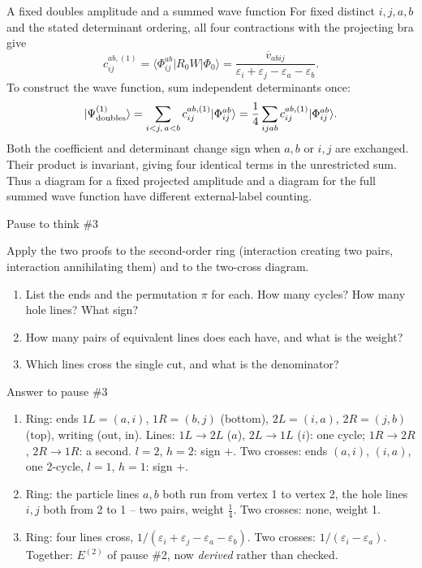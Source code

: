 \documentclass[aspectratio=169,10pt]{beamer}
\newcounter{thinkctr}
\newcommand{\thinkq}[2]{%
  \stepcounter{thinkctr}%
  \vfill
  \begin{tcolorbox}[enhanced,colback=palewarm,colframe=warm,boxrule=1.2pt,arc=4pt,
    grow to left by=6mm,grow to right by=6mm,
    left=16pt,right=16pt,top=16pt,bottom=18pt,
    fonttitle=\bfseries\Large,fontupper=\Large,
    title={Pause to think \#\thethinkctr\hfill\mdseries\normalsize(about #1 min -- discuss with your neighbour)}]
  #2
  \end{tcolorbox}
  \vfill}
\newcommand{\thinka}[1]{%
  \vfill
  \begin{tcolorbox}[enhanced,colback=paleteal,colframe=teal,boxrule=1.2pt,arc=4pt,
    grow to left by=6mm,grow to right by=6mm,
    left=16pt,right=16pt,top=16pt,bottom=18pt,
    fonttitle=\bfseries\Large,fontupper=\large,
    title={Answer to pause \#\thethinkctr}]
  #1
  \end{tcolorbox}
  \vfill}
\newcommand{\ket}[1]{\vert #1\rangle}
\newcommand{\mel}[3]{\langle #1\lvert #2\rvert #3\rangle}
\newcommand{\vbar}[4]{\overline v_{#1#2#3#4}}
\newcommand{\ph}{\Phi_0}
\begin{document}
\begin{frame}{A fixed doubles amplitude and a summed wave function}
For fixed distinct $i,j,a,b$ and the stated determinant ordering, all four contractions with the projecting bra give
\[
 c_{ij}^{ab,(1)}=\mel{\Phi_{ij}^{ab}}{R_0W}{\ph}
 =\frac{\vbar{a}{b}{i}{j}}{\varepsilon_i+\varepsilon_j-\varepsilon_a-\varepsilon_b}.
\]
To construct the wave function, sum independent determinants once:
\[
 \ket{\Psi^{(1)}_{\rm doubles}}=
 \sum_{i<j,\,a<b}c_{ij}^{ab,(1)}\ket{\Phi_{ij}^{ab}}
 =\frac14\sum_{ijab}c_{ij}^{ab,(1)}\ket{\Phi_{ij}^{ab}}.
\]
Both the coefficient and determinant change sign when $a,b$ or $i,j$ are exchanged. Their product is invariant, giving four identical terms in the unrestricted sum. Thus a diagram for a fixed projected amplitude and a diagram for the full summed wave function have different external-label counting.
\end{frame}


\begin{frame}{Pause to think \#3}
\thinkq{4}{Apply the two proofs to the second-order ring (interaction creating two pairs, interaction annihilating them) and to the two-cross diagram.
\begin{enumerate}
\item List the ends and the permutation \(\pi\) for each. How many cycles? How many hole lines? What sign?
\item How many pairs of equivalent lines does each have, and what is the weight?
\item Which lines cross the single cut, and what is the denominator?
\end{enumerate}}
\end{frame}

\begin{frame}{Answer to pause \#3}
\thinka{%
\begin{enumerate}
\item Ring: ends \(1L=(a,i)\), \(1R=(b,j)\) (bottom), \(2L=(i,a)\), \(2R=(j,b)\) (top), writing (out, in). Lines: \(1L\to2L\) (\(a\)), \(2L\to1L\) (\(i\)): one cycle; \(1R\to2R\), \(2R\to1R\): a second. \(l=2\), \(h=2\): sign \(+\). Two crosses: ends \((a,i)\), \((i,a)\), one 2-cycle, \(l=1\), \(h=1\): sign \(+\).
\item Ring: the particle lines \(a,b\) both run from vertex 1 to vertex 2, the hole lines \(i,j\) both from 2 to 1 -- two pairs, weight \(\tfrac14\). Two crosses: none, weight 1.
\item Ring: four lines cross, \(1/(\varepsilon_i+\varepsilon_j-\varepsilon_a-\varepsilon_b)\). Two crosses: \(1/(\varepsilon_i-\varepsilon_a)\). Together: \(E^{(2)}\) of pause \#2, now \emph{derived} rather than checked.
\end{enumerate}}
\end{frame}
\end{document}
